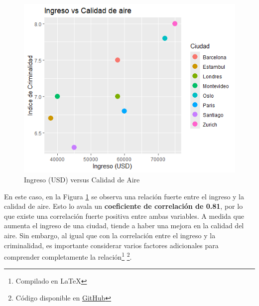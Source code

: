\documentclass{article}
\begin{document}
\begin{figure}[h!]
    \centering
    \includegraphics[scale = 0.7]{Tarea_1_2bpng.png}
    \caption{Ingreso (USD) versus Calidad de Aire}
    \label{fig:enter-label2}
\end{figure}

En este caso, en la Figura \ref{fig:enter-label2} se observa una relación fuerte entre el ingreso y la calidad de aire. Esto lo avala un \textbf{coeficiente de correlación de 0.81}, por lo que existe una correlación fuerte positiva entre ambas variables. A medida que aumenta el ingreso de una ciudad, tiende a haber una mejora en la calidad del aire. Sin embargo, al igual que con la correlación entre el ingreso y la criminalidad, es importante considerar varios factores adicionales para comprender completamente la relación\footnote{Compilado en \LaTeX} \footnote{Código disponible en \href{https://github.com/zoendeloi/MPP-ADI}{GitHub}}. 
\end{document}

